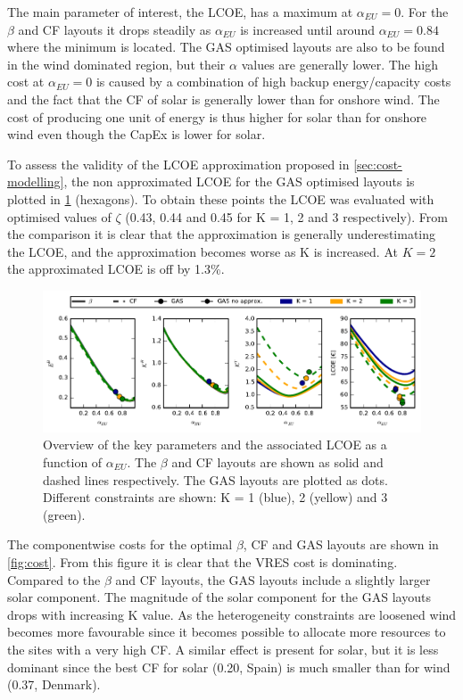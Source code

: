 \documentclass[a4paper, 5p, sort&compress]{elsarticle}%
\begin{document}
The main parameter of interest, the LCOE, has a maximum at
$\alpha_{EU} = 0$. For the $\beta$ and CF layouts it drops steadily as
$\alpha_{EU}$ is increased until around $\alpha_{EU} = 0.84$ where the minimum
is located. The GAS optimised layouts are also to be found in the wind
dominated region, but their $\alpha$ values are generally lower. The high
cost at $\alpha_{EU} = 0$ is caused by a combination of high backup
energy/capacity costs and the fact that the CF of solar is generally
lower than for onshore wind. The cost of producing one unit of energy
is thus higher for solar than for onshore wind even though the
\gls{CapEx} is lower for solar.

To assess the validity of the LCOE approximation proposed in
\cref{sec:cost-modelling}, the non approximated LCOE for the GAS
optimised layouts is plotted in \cref{fig:overview} (hexagons). To
obtain these points the LCOE was evaluated with optimised values of
$\zeta$ (0.43, 0.44 and 0.45 for K = 1, 2 and 3 respectively). From the
comparison it is clear that the approximation is generally
underestimating the LCOE, and the approximation becomes worse as K is
increased. At $K=2$ the approximated LCOE is off by 1.3\%.

\begin{figure}[t!]
  \centering
  \includegraphics[width = 2\columnwidth]{dataSync-new}
  \caption{Overview of the key parameters and the associated LCOE as a
    function of $\alpha_{EU}$. The $\beta$ %
    and CF %
    layouts are shown as solid and dashed lines respectively. The GAS
    layouts are plotted as dots. Different constraints are shown: K =
    1 (blue), 2 (yellow) and 3 (green).}
  \label{fig:overview}
\end{figure}

The componentwise costs for the optimal $\beta$, CF and GAS layouts are
shown in \cref{fig:cost}. From this figure it is clear that the VRES
cost is dominating. Compared to the $\beta$ and CF layouts, the GAS
layouts include a slightly larger solar component. The magnitude of
the solar component for the GAS layouts drops with increasing K
value. As the heterogeneity constraints are loosened wind becomes more
favourable since it becomes possible to allocate more resources to the
sites with a very high CF. A similar effect is present for solar, but
it is less dominant since the best CF for solar (0.20, Spain) is much
smaller than for wind (0.37, Denmark).
\end{document}
